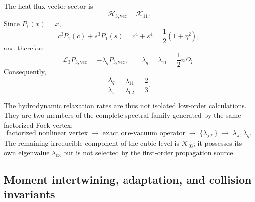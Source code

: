\documentclass[11pt,oneside]{article}
\numberwithin{equation}{section}
\theoremstyle{definition}
\begin{document}
The heat-flux vector sector is
\begin{equation}
\mathscr H_{3,\mathrm{vec}}
=
\mathscr K_{11}.
\end{equation}
Since $P_1(x)=x$,
\begin{equation}
c^3P_1(c)+s^3P_1(s)
=
c^4+s^4
=
\frac12(1+\eta^2),
\end{equation}
and therefore
\begin{equation}
\widehat{\mathcal L}_3
P_{3,\mathrm{vec}}
=
-\lambda_q P_{3,\mathrm{vec}},
\qquad
\lambda_q
=
\lambda_{11}
=
\frac12n\Omega_2.
\label{eq:maxwell_lambda_q}
\end{equation}
Consequently,
\begin{equation}
\frac{\lambda_q}{\lambda_\pi}
=
\frac{\lambda_{11}}{\lambda_{02}}
=
\frac23.
\label{eq:maxwell_eigenvalue_ratio}
\end{equation}

The hydrodynamic relaxation rates are thus not isolated low-order
calculations.  They are two members of the complete spectral family
generated by the same factorized Fock vertex:
\begin{equation}
\text{factorized nonlinear vertex}
\;\longrightarrow\;
\text{exact one-vacuum operator}
\;\longrightarrow\;
\{\lambda_{j\ell}\}
\;\longrightarrow\;
\lambda_\pi,\lambda_q.
\label{eq:maxwell_spectrum_to_hydrodynamics}
\end{equation}
The remaining irreducible component of the cubic level is
$\mathscr K_{03}$; it possesses its own eigenvalue
$\lambda_{03}$ but is not selected by the first-order propagation
source.





\subsection{Moment intertwining, adaptation, and collision invariants}
\label{subsec:maxwell_moment_compatibility}
\label{subsec:maxwell_collision_invariants}
\end{document}
